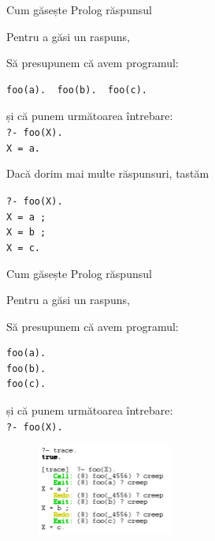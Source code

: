 \documentclass[xcolor=x11names,compress,10pt]{beamer}
\begin{document}
\begin{frame}[fragile]{Cum găsește Prolog răspunsul}

Pentru a găsi un raspuns, 

\medskip 
\begin{example}

Să presupunem că avem programul: 
\begin{verbatim}
foo(a).  foo(b).  foo(c).
\end{verbatim}
și că punem următoarea întrebare: \\
{\color{blue}\texttt{?- foo(X).}}\\
{\color{blue}\texttt{X = a.}}\\

\smallskip\pause

Dacă dorim mai multe răspunsuri, tastăm \color{blue}{\texttt{;}}\\
\smallskip

{\color{blue}\texttt{?- foo(X).}}\\
{\color{blue}\texttt{X = a ;}}\\
{\color{blue}\texttt{X = b ;}}\\
{\color{blue}\texttt{X = c.}}


\end{example}

\end{frame}

\addtocounter{framenumber}{-1}
\begin{frame}[fragile]{Cum găsește Prolog răspunsul}

Pentru a găsi un raspuns, 

\medskip
\begin{example}
\begin{multicols}{2}
Să presupunem că avem programul: 
\begin{verbatim}
foo(a). 
foo(b). 
foo(c).
\end{verbatim}
și că punem următoarea întrebare: \\
{\color{blue}\texttt{?- foo(X).}}
\columnbreak
\begin{figure}[h]
    \includegraphics[width=0.4\textwidth]{prolog/trace1}
\end{figure}
\end{multicols}
\end{example}
\end{frame}
\end{document}
